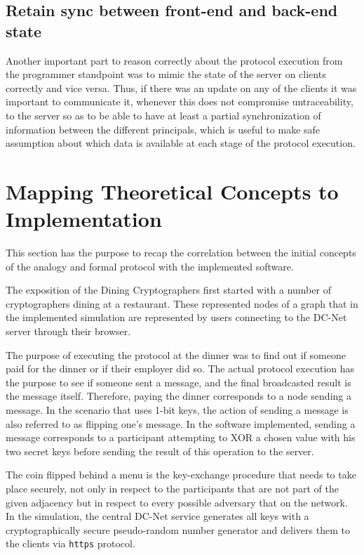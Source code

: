 \subsection{Retain sync between front-end and back-end state}
Another important part to reason correctly about the protocol execution from the programmer standpoint was to mimic the state of the server on clients correctly and vice versa. Thus, if there was an update on any of the clients it was important to communicate it, whenever this does not compromise untraceability, to the server so as to be able to have at least a partial synchronization of information between the different principals, which is useful to make safe assumption about which data is available at each stage of the protocol execution.


\section{Mapping Theoretical Concepts to Implementation}
This section has the purpose to recap the correlation between the initial concepts of the analogy and formal protocol with the implemented software. \newline

The exposition of the Dining Cryptographers first started with a number of cryptographers dining at a restaurant. These represented nodes of a graph that in the implemented simulation are represented by users connecting to the DC-Net server through their browser. \newline

The purpose of executing the protocol at the dinner was to find out if someone paid for the dinner or if their employer did so. The actual protocol execution has the purpose to see if someone sent a message, and the final broadcasted result is the message itself. Therefore, paying the dinner corresponds to a node sending a message. In the scenario that uses 1-bit keys, the action of sending a message is also referred to as flipping one's message. In the software implemented, sending a message corresponds to a participant attempting to XOR a chosen value with his two secret keys before sending the result of this operation to the server. \newline

The coin flipped behind a menu is the key-exchange procedure that needs to take place securely, not only in respect to the participants that are not part of the given adjacency but in respect to every possible adversary that on the network. In the simulation, the central DC-Net service generates all keys with a cryptographically secure pseudo-random number generator and delivers them to the clients via \lstinline{https} protocol. \newline

